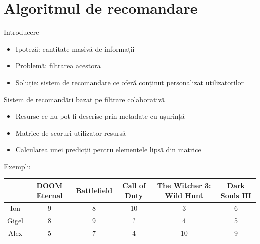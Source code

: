 \documentclass{beamer}
\begin{document}
\section{Algoritmul de recomandare}
\frame{\tableofcontents[currentsection]}
\begin{frame}{Introducere}
 
    \begin{itemize}
        \item Ipoteză: cantitate masivă de informații
        \item Problemă: filtrarea acestora
        \item Soluție: sistem de recomandare ce oferă conținut personalizat utilizatorilor
    \end{itemize}
\end{frame}

\begin{frame}{Sistem de recomandări bazat pe filtrare colaborativă}
    \begin{itemize}
        \item Resurse ce nu pot fi descrise prin metadate cu ușurință
        \item Matrice de scoruri utilizator-resursă
        \item Calcularea unei predicții pentru elementele lipsă din matrice
    \end{itemize}
\end{frame}

\begin{frame}{Exemplu}
\begin{center}
\begin{adjustbox}{max size={\textwidth}{\textheight}}
\begin{tabular}{||c c c c c c||} 
 \hline
 & DOOM Eternal & Battlefield & Call of Duty & The Witcher 3: Wild Hunt & Dark Souls III \\ [0.5ex] 
 \hline\hline
 Ion & 9 & 8 & 10 & 3 & 6 \\ 
 \hline
 Gigel & 8 & 9 & ? & 4 & 5  \\
 \hline
 Alex & 5 & 7 & 4 & 10 & 9 \\
 \hline
\end{tabular}
\end{adjustbox}
\end{center}
    
\end{frame}

\end{document}
